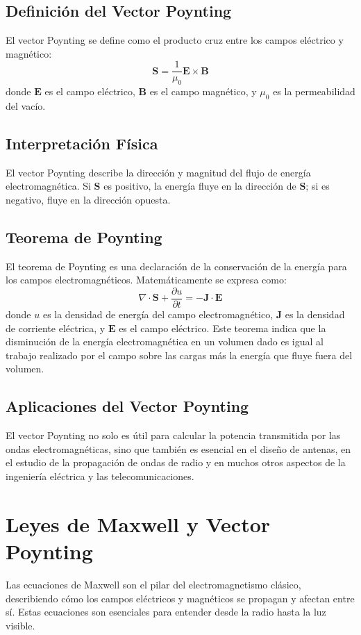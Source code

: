 \documentclass{article}
\begin{document}
\subsection{Definición del Vector Poynting}
El vector Poynting se define como el producto cruz entre los campos eléctrico y magnético:
\begin{equation}
	\mathbf{S} = \frac{1}{\mu_0} \mathbf{E} \times \mathbf{B}
\end{equation}
donde \(\mathbf{E}\) es el campo eléctrico, \(\mathbf{B}\) es el campo magnético, y \(\mu_0\) es la permeabilidad del vacío.

\subsection{Interpretación Física}
El vector Poynting describe la dirección y magnitud del flujo de energía electromagnética. Si \(\mathbf{S}\) es positivo, la energía fluye en la dirección de \(\mathbf{S}\); si es negativo, fluye en la dirección opuesta.

\subsection{Teorema de Poynting}
El teorema de Poynting es una declaración de la conservación de la energía para los campos electromagnéticos. Matemáticamente se expresa como:
\begin{equation}
	\nabla \cdot \mathbf{S} + \frac{\partial u}{\partial t} = -\mathbf{J} \cdot \mathbf{E}
\end{equation}
donde \(u\) es la densidad de energía del campo electromagnético, \(\mathbf{J}\) es la densidad de corriente eléctrica, y \(\mathbf{E}\) es el campo eléctrico. Este teorema indica que la disminución de la energía electromagnética en un volumen dado es igual al trabajo realizado por el campo sobre las cargas más la energía que fluye fuera del volumen.

\subsection{Aplicaciones del Vector Poynting}
El vector Poynting no solo es útil para calcular la potencia transmitida por las ondas electromagnéticas, sino que también es esencial en el diseño de antenas, en el estudio de la propagación de ondas de radio y en muchos otros aspectos de la ingeniería eléctrica y las telecomunicaciones.

\section{Leyes de Maxwell y Vector Poynting}
Las ecuaciones de Maxwell son el pilar del electromagnetismo clásico, describiendo cómo los campos eléctricos y magnéticos se propagan y afectan entre sí. Estas ecuaciones son esenciales para entender desde la radio hasta la luz visible.
\end{document}
